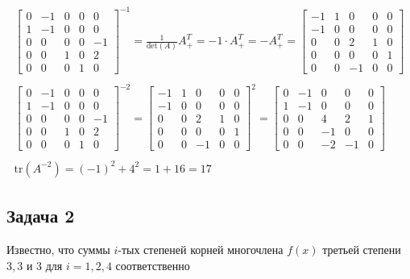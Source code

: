 	\begin{gather*}
		\begin{bmatrix}
			0 & -1 & 0 & 0 & 0 \\
			1 & -1 & 0 & 0 & 0 \\
			0 & 0 & 0 & 0 & -1 \\
			0 & 0 & 1 & 0 & 2 \\
			0 & 0 & 0 & 1 & 0
		\end{bmatrix}
		^{-1}
		=
		\frac{1}{\text{det}(A)} A^{T}_{+}
		=
		-1 \cdot A^{T}_{+}
		=
		-A^{T}_{+}
		=
		\begin{bmatrix}
			-1 & 1 & 0 & 0 & 0 \\
			-1 & 0 & 0 & 0 & 0 \\
			0 & 0 & 2 & 1 & 0 \\
			0 & 0 & 0 & 0 & 1 \\
			0 & 0 & -1 & 0 & 0
		\end{bmatrix}
		\\
		\\
		\begin{bmatrix}
			0 & -1 & 0 & 0 & 0 \\
			1 & -1 & 0 & 0 & 0 \\
			0 & 0 & 0 & 0 & -1 \\
			0 & 0 & 1 & 0 & 2 \\
			0 & 0 & 0 & 1 & 0
		\end{bmatrix}
		^{-2}
		=
		\begin{bmatrix}
			-1 & 1 & 0 & 0 & 0 \\
			-1 & 0 & 0 & 0 & 0 \\
			0 & 0 & 2 & 1 & 0 \\
			0 & 0 & 0 & 0 & 1 \\
			0 & 0 & -1 & 0 & 0
		\end{bmatrix}
		^{2}
		=
		\begin{bmatrix}
			0 & -1 & 0 & 0 & 0 \\
			1 & -1 & 0 & 0 & 0 \\
			0 & 0 & 4 & 2 & 1 \\
			0 & 0 & -1 & 0 & 0 \\
			0 & 0 & -2 & -1 & 0
		\end{bmatrix}
		\\
		\\
		\text{tr}(A^{-2}) = (-1)^{2} + 4^{2} = 1 + 16 = 17
	\end{gather*}
	
	\newpage
	\subsection*{\textbf{Задача 2}}
	Известно, что суммы $i$-тых степеней корней многочлена $f(x)$ третьей степени $3,3$ и $3$ для $i = 1,2,4$ соответственно
